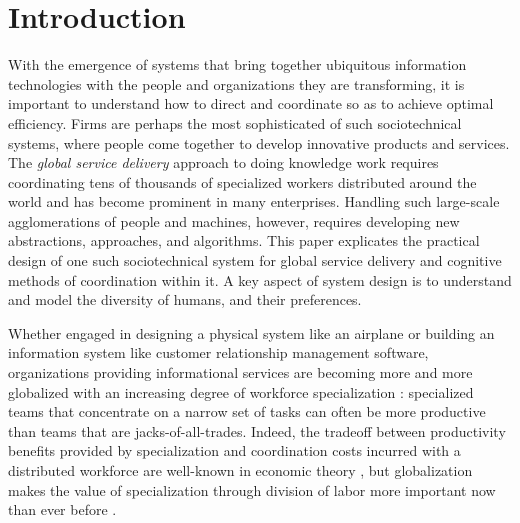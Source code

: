 \documentclass[10pt,journal,cspaper,compsoc]{IEEEtran}
\begin{document}
\section{Introduction}
With the emergence of systems that bring together ubiquitous information technologies with the people and organizations 
they are transforming, it is important to understand how to direct and coordinate so as to achieve optimal efficiency.  
Firms are perhaps the most sophisticated of such sociotechnical systems, where people come together to develop 
innovative products and services.  The \emph{global service delivery} approach to doing knowledge work requires 
coordinating tens of thousands of specialized workers distributed around the world and has become prominent in 
many enterprises. Handling such large-scale agglomerations of people and machines, however, requires developing new 
abstractions, approaches, and algorithms.  This paper explicates the practical design of one such sociotechnical system 
for global service delivery and cognitive methods of coordination within it.  A key aspect of system design is
to understand and model the diversity of humans, and their preferences.

Whether engaged in designing a physical system like an airplane or building an information system like customer 
relationship management software, organizations providing informational services are becoming more and more 
globalized with an increasing degree of workforce specialization \cite{Bollier2011,MaloneLJ2011,Palmisano2006}:
specialized teams that concentrate on a narrow set of tasks can often be more productive than teams that are 
jacks-of-all-trades.  Indeed, the tradeoff between productivity benefits provided by specialization and coordination 
costs incurred with a distributed workforce are well-known in economic theory \cite{BeckerM1992, EhretW2010},
but globalization makes the value of specialization through division of labor more important 
now than ever before \cite{Stigler1951}. 
\end{document}
